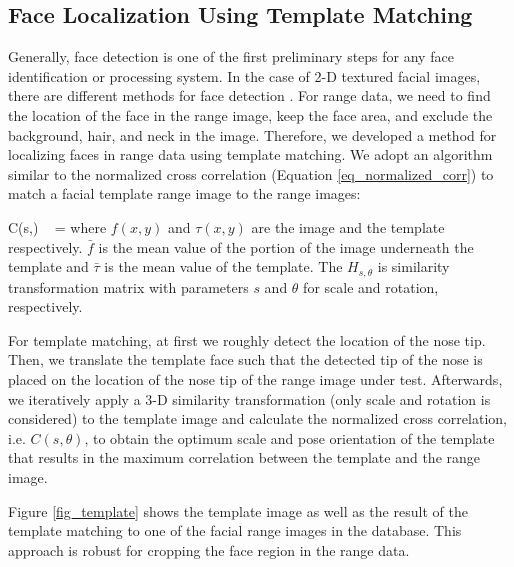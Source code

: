 \subsection{Face Localization Using Template Matching}
Generally, face detection is one of the first preliminary steps for
any face identification or processing system. In the case of 2-D
textured facial images, there are different methods for face
detection \cite{Adaboost, Rowley98, Mottaleb02}. For range data, we
need to find the location of the face in the range image, keep the
face area, and exclude the background, hair, and neck in the image.
Therefore, we developed a method for localizing faces in range data
using template matching. We adopt an algorithm similar to the
normalized cross correlation (Equation \ref{eq_normalized_corr}) to
match a facial template range image to the range images:

\beq C(s,\theta) ~ =  \label{eq_normalized_corr} \eeq where
$f(x,y)$ and $\tau(x,y)$ are the image and the template
respectively. $\bar{f}$ is the mean value of the portion of the
image underneath the template and $\bar{\tau}$ is the mean value of
the template. The $H_{s,\theta}$ is similarity transformation matrix
with parameters $s$ and $\theta$ for scale and rotation,
respectively.

For template matching, at first we roughly detect the location of
the nose tip. Then, we translate the template face such that the
detected tip of the nose is placed on the location of the nose tip
of the range image under test. Afterwards, we iteratively apply a
3-D similarity transformation (only scale and rotation is
considered) to the template image and calculate the normalized cross
correlation, i.e. $C(s, \theta)$, to obtain the optimum scale and
pose orientation of the template that results in the maximum
correlation between the template and the range image.

Figure \ref{fig_template} shows the template image as well as the
result of the template matching to one of the facial range images in
the database. This approach is robust for cropping the face region
in the range data.

